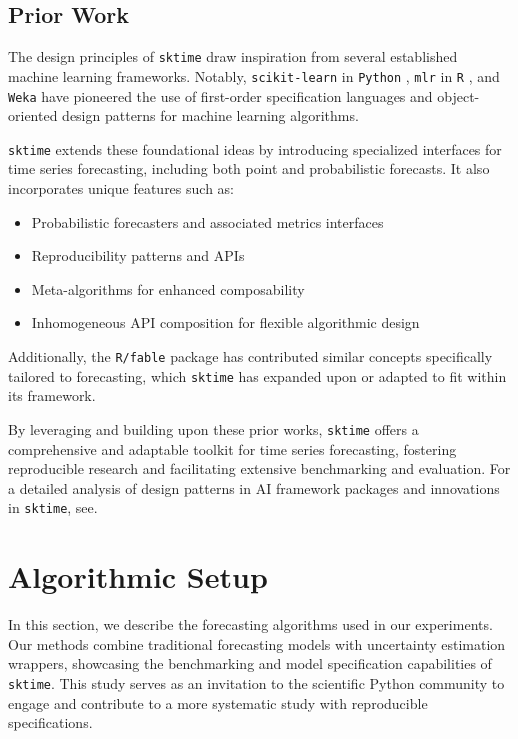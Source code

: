 \subsection{Prior Work}
The design principles of \texttt{sktime} draw inspiration from several established machine learning frameworks. Notably, \texttt{scikit-learn} in \texttt{Python} \cite{pedregosa2011scikit}, \texttt{mlr} in \texttt{R} \cite{bischl2016mlr}, and \texttt{Weka} \cite{hall2009weka} have pioneered the use of first-order specification languages and object-oriented design patterns for machine learning algorithms. 

\texttt{sktime} extends these foundational ideas by introducing specialized interfaces for time series forecasting, including both point and probabilistic forecasts. It also incorporates unique features such as:
\begin{itemize}
    \item Probabilistic forecasters and associated metrics interfaces
    \item Reproducibility patterns and APIs
    \item Meta-algorithms for enhanced composability
    \item Inhomogeneous API composition for flexible algorithmic design
\end{itemize}

Additionally, the \texttt{R/fable} package \cite{hyndman2020package} has contributed similar concepts specifically tailored to forecasting, which \texttt{sktime} has expanded upon or adapted to fit within its framework.

By leveraging and building upon these prior works, \texttt{sktime} offers a comprehensive and adaptable toolkit for time series forecasting, fostering reproducible research and facilitating extensive benchmarking and evaluation.
For a detailed analysis of design patterns in AI framework packages and innovations in \texttt{sktime}, see\cite{kiraly2021designing}.

\section{Algorithmic Setup} \label{methods}

In this section, we describe the forecasting algorithms used in our experiments. Our methods combine traditional forecasting models with uncertainty estimation wrappers, showcasing the benchmarking and model specification capabilities of \texttt{sktime}. This study serves as an invitation to the scientific Python community to engage and contribute to a more systematic study with reproducible specifications.

